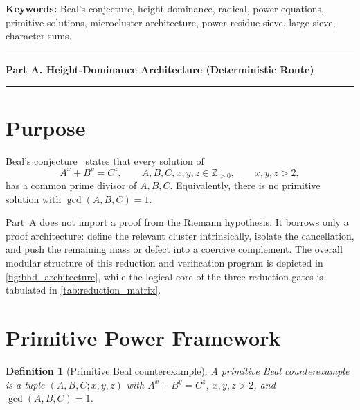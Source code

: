 \documentclass[11pt,a4paper]{article}
\newtheorem{definition}[theorem]{Definition}
\begin{document}
\begin{abstract}
Version 1.1 corrects the genus and regime classification, the null-row
direction and sieve domains, the scalar-family monodromy and strong-sum
claims, and the scope of the classical $(3,4,5)$ result. The elementary
$\Xi\ge\log4$ inequality provides no IUT/gcd bridge; historical diagnostic
scores and hard-coded gates provide no Beal exclusion. Numerical tables
remain historical diagnostics. HD3', typed transfers, explicit constants,
independent method validation and complete source/proof review remain open.
\end{abstract}

\noindent\textbf{Keywords:} Beal's conjecture, height dominance,
radical, power equations, primitive solutions, microcluster
architecture, power-residue sieve, large sieve, character sums.

\clearpage
\tableofcontents
\clearpage

\bigskip
\hrule
\medskip
\begin{center}
\textbf{Part A. Height-Dominance Architecture (Deterministic Route)}
\end{center}
\medskip
\hrule
\bigskip

\section{Purpose}

Beal's conjecture~\cite{Mauldin1997} states that every solution of
\[
  A^x + B^y = C^z,
  \qquad A,B,C,x,y,z \in \mathbb Z_{>0},
  \qquad x,y,z>2,
\]
has a common prime divisor of $A,B,C$. Equivalently, there is no
primitive solution with $\gcd(A,B,C)=1$.

Part~A does not import a proof from the Riemann hypothesis. It borrows
only a proof architecture: define the relevant cluster intrinsically,
isolate the cancellation, and push the remaining mass or defect into a
coercive complement. The overall modular structure of this reduction and
verification program is depicted in \cref{fig:bhd_architecture}, while the
logical core of the three reduction gates is tabulated in \cref{tab:reduction_matrix}.

\section{Primitive Power Framework}

\begin{definition}[Primitive Beal counterexample]
A primitive Beal counterexample is a tuple $(A,B,C;x,y,z)$ with
$A^x+B^y=C^z$, $x,y,z>2$, and $\gcd(A,B,C)=1$.
\end{definition}
\end{document}
